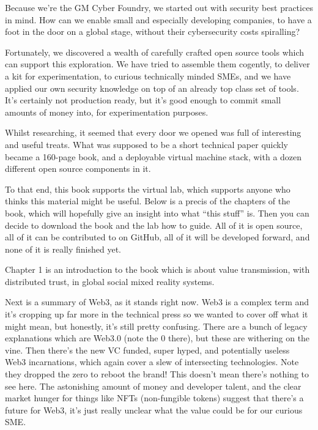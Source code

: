 Because we’re the GM Cyber Foundry, we started out with security best practices in mind. How can we enable small and especially developing companies, to have a foot in the door on a global stage, without their cybersecurity costs spiralling? \par
Fortunately, we discovered a wealth of carefully crafted open source tools which can support this exploration. We have tried to assemble them cogently, to deliver a kit for experimentation, to curious technically minded SMEs, and we have applied our own security knowledge on top of an already top class set of tools. It’s certainly not production ready, but it's good enough to commit small amounts of money into, for experimentation purposes.\par
Whilst researching, it seemed that every door we opened was full of interesting and useful treats. What was supposed to be a short technical paper quickly became a 160-page book, and a deployable virtual machine stack, with a dozen different open source components in it. \par
To that end, this book supports the virtual lab, which supports anyone who thinks this material might be useful. Below is a precis of the chapters of the book, which will hopefully give an insight into what ``this stuff'' is. Then you can decide to download the book and the lab how to guide. All of it is open source, all of it can be contributed to on GitHub, all of it will be developed forward, and none of it is really finished yet.\par
Chapter 1  is an introduction to the book which is about value transmission, with distributed trust, in global social mixed reality systems. \par
Next is a summary of Web3, as it stands right now. Web3 is a complex term and it’s cropping up far more in the technical press so we wanted to cover off what it might mean, but honestly, it’s still pretty confusing. There are a bunch of legacy explanations which are Web3.0 (note the 0 there), but these are withering on the vine. Then there’s the new VC funded, super hyped, and potentially useless Web3 incarnations, which again cover a slew of intersecting technologies. Note they dropped the zero to reboot the brand! This doesn’t mean there’s nothing to see here. The astonishing amount of money and developer talent, and the clear market hunger for things like NFTs (non-fungible tokens) suggest that there’s a future for Web3, it’s just really unclear what the value could be for our curious SME.\par
